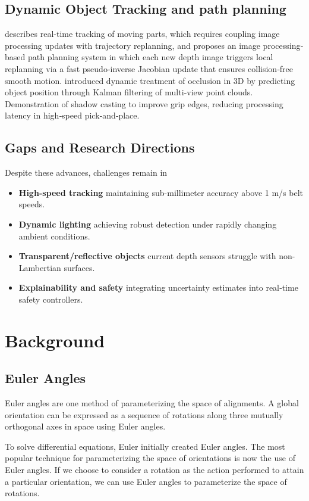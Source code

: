 \documentclass[12pt]{article}
\begin{document}
\subsection{Dynamic Object Tracking and path planning} \cite{ref1} describes real-time tracking of moving parts, which requires coupling image processing updates with trajectory replanning, and proposes an image processing‐based path planning system in which each new depth image triggers local replanning via a fast pseudo‐inverse Jacobian update that ensures collision‐free smooth motion.\cite{ref4} introduced dynamic treatment of occlusion in 3D by predicting object position through Kalman filtering of multi‐view point clouds.\cite{ref7} Demonstration of shadow casting to improve grip edges, reducing processing latency in high‐speed pick‐and‐place.

\subsection{Gaps and Research Directions}
Despite these advances, challenges remain in  
\begin{itemize}[nosep]
  \item \textbf{High‐speed tracking} maintaining sub-millimeter accuracy above 1 m/s belt speeds.
  \item \textbf{Dynamic lighting} achieving robust detection under rapidly changing ambient conditions.
  \item \textbf{Transparent/reflective objects} current depth sensors struggle with non-Lambertian surfaces.
  \item \textbf{Explainability and safety} integrating uncertainty estimates into real‐time safety controllers.
\end{itemize}


\newpage
\section{Background}
\subsection{Euler Angles}
Euler angles are one method of parameterizing the space of alignments.  A global orientation can be expressed as a sequence of rotations along three mutually orthogonal axes in space using Euler angles.

To solve differential equations, Euler initially created Euler angles. The most popular technique for parameterizing the space of orientations is now the use of Euler angles. If we choose to consider a rotation as the action performed to attain a particular orientation, we can use Euler angles to parameterize the space of rotations\cite{ref20}.
\end{document}
